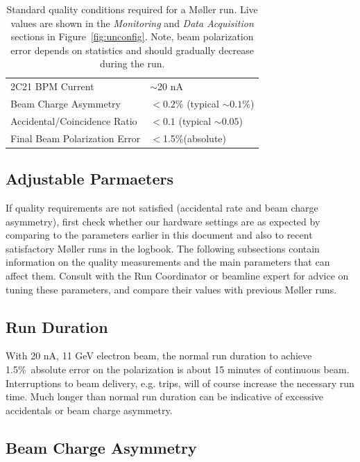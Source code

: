 \documentclass[amsmath,amssymb,notitlepage,12pt]{revtex4}
\newcommand{\ibeam}{20 nA\ }
\newcommand{\easy}{1.5\%}
\begin{document}
\begin{table}[htbp]\centering
    \begin{tabular}{ll}\toprule[1.5pt]
        2C21 BPM Current & $\sim$\ibeam\\
        Beam Charge Asymmetry & $<0.2\%$ (typical $\sim 0.1\%$)\\
        Accidental/Coincidence Ratio & $<0.1$ (typical $\sim 0.05$)\\
        Final Beam Polarization Error & $<$\easy (absolute)\\
        \bottomrule[1.5pt]
    \end{tabular}
    \caption{Standard quality conditions required for a M{\o}ller run.  Live values are shown in the {\em Monitoring} and {\em Data Acquisition} sections in Figure~\ref{fig:unconfig}.  Note, beam polarization error depends on statistics and should gradually decrease during the run.\label{tab:reqs}}
\end{table}

\subsection{Adjustable Parmaeters}\label{sec:knobs}

If quality requirements are not satisfied (accidental rate and beam charge asymmetry), first check whether our hardware settings are as expected by comparing to the parameters earlier in this document and also to recent satisfactory M{\o}ller runs in the logbook.  The following subsections contain information on the quality measurements and the main parameters that can affect them.  Consult with the Run Coordinator or beamline expert for advice on tuning these parameters, and compare their values with previous M{\o}ller runs.

\subsection{Run Duration}

With 20 nA, 11 GeV electron beam, the normal run duration to achieve \easy\ absolute error on the polarization is about 15 minutes of continuous beam.  Interruptions to beam delivery, e.g. trips, will of course increase the necessary run time.  Much longer than normal run duration can be indicative of excessive accidentals or beam charge asymmetry.

\subsection{Beam Charge Asymmetry}
\end{document}
